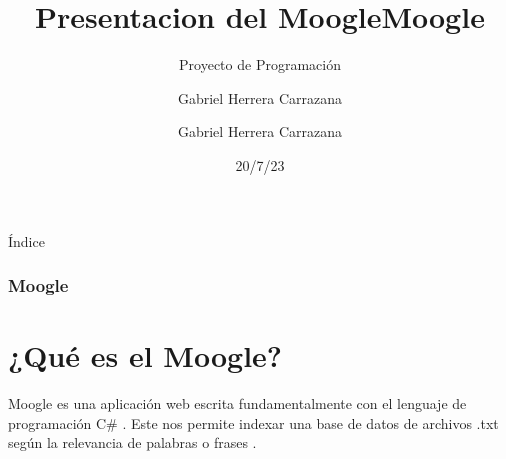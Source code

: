 \documentclass{beamer}
\title{Presentacion del Moogle}
\author{Gabriel Herrera Carrazana}
\date{20/7/23}
\title[Moogle]{Moogle}
\subtitle{Proyecto de Programación}
\author[Gabriel Herrera]{Gabriel Herrera Carrazana}
\institute[MatCom] { Facultad de Matemática y Computación}
\begin{document}
\itshape






	\frame{\titlepage}
	\begin{frame}{Índice}
		\tableofcontents
	\end{frame}
	
	
	\begin{frame}
	
		
		\frametitle{Moogle}
		\section{¿Qué es el Moogle?}
		
			Moogle es una aplicación web escrita fundamentalmente con el lenguaje de programación C\# . Este nos permite indexar una base de datos de archivos .txt según la relevancia de palabras o frases .  \
		
	\end{frame}
	
\end{document}
